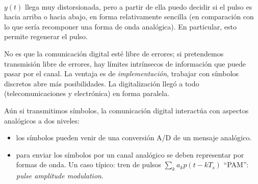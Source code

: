 \begin{ejemplo}$\phantom{1}$

    \FloatBarrier

    \begin{figure}[htb]
        \centering\begin{minipage}{\textwidth}
        \endpgfgraphicnamed\end{minipage}
    \end{figure}
    \FloatBarrier

    $y(t)$ llega muy distorsionada, pero a partir de ella puedo decidir si el pulso es hacia arriba o hacia abajo, en forma relativamente sencilla (en comparación con lo que sería recomponer una forma de onda analógica). En particular, esto permite regenerar el pulso.

\end{ejemplo}


    No es que la comunicación digital esté libre de errores; si
    pretendemos transmisión libre de errores, hay límites
    intrínsecos de información que puede pasar por el canal.
    La ventaja es de \emph{implementación}, trabajar
    con símbolos discretos abre más posibilidades. La digitalización
    llegó a todo (telecomunicaciones y electrónica) en forma
    paralela.
%


Aún si transmitimos símbolos, la comunicación digital interactúa
con aspectos analógicos a dos niveles:


\begin{itemize}
    \item los símbolos pueden venir de una conversión A/D de un mensaje analógico.
    \item para enviar los símbolos por un canal analógico se deben representar
    por formas de onda. Un caso típico: tren de pulsos $\displaystyle \sum_k a_k p(t-kT_s)$ ``PAM'': \emph{pulse amplitude modulation}.
\end{itemize}

